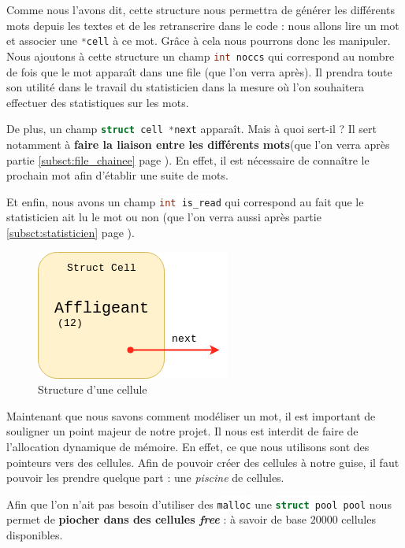 \documentclass{article}
\newcommand{\inlinecode}[2]{\colorbox{white}{\lstinline[language=#1]$#2$}}
\begin{document}
Comme nous l'avons dit, cette structure nous permettra de générer les différents mots depuis les textes et de les retranscrire dans le code : nous allons lire un mot et associer une \inlinecode{C}{*cell} à ce mot. Grâce à cela nous pourrons donc les manipuler. Nous ajoutons à cette structure un champ \inlinecode{C}{int noccs} qui correspond au nombre de fois que le mot apparaît dans une file (que l'on verra après). Il prendra toute son utilité dans le travail du statisticien dans la mesure où l'on souhaitera effectuer des statistiques sur les mots.

De plus, un champ \inlinecode{C}{struct cell *next} apparaît. Mais à quoi sert-il ? Il sert notamment à \textbf{faire la liaison entre les différents mots}(que l'on verra après partie \ref{subsct:file_chainee} page \pageref{subsct:file_chainee}). En effet, il est nécessaire de connaître le prochain mot afin d'établir une suite de mots.

Et enfin, nous avons un champ \inlinecode{C}{int is_read} qui correspond au fait que le statisticien ait lu le mot ou non (que l'on verra aussi après partie \ref{subsct:statisticien} page \pageref{subsct:statisticien}).

\begin{figure}[ht!]
\centering
\includegraphics[scale=0.5]{structcell.png}
\caption{Structure d'une cellule}
\label{fig:structcell}
\end{figure}

Maintenant que nous savons comment modéliser un mot, il est important de souligner un point majeur de notre projet. Il nous est interdit de faire de l'allocation dynamique de mémoire. En effet, ce que nous utilisons sont des pointeurs vers des cellules. Afin de pouvoir créer des cellules à notre guise, il faut pouvoir les prendre quelque part : une \textit{piscine} de cellules.

Afin que l'on n'ait pas besoin d'utiliser des \inlinecode{C}{malloc} une \inlinecode{C}{struct pool pool} nous permet de \textbf{piocher dans des cellules \textit{free}} : à savoir de base $20000$ cellules disponibles.
\end{document}

